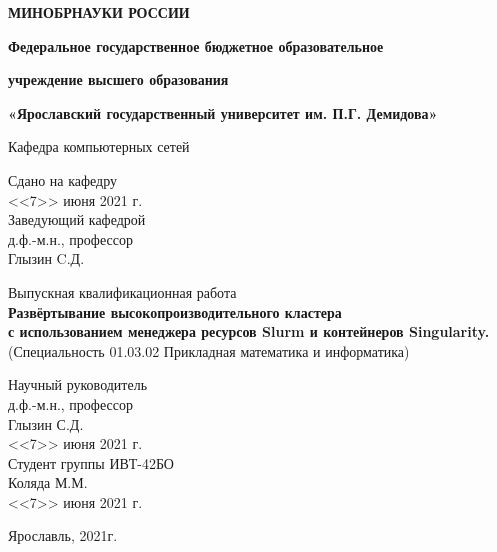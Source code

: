 \documentclass[a4paper]{extarticle}
\begin{document}
%
%
%
\begin{titlepage}
\fontsize{14pt}{12pt}
\begin{center}
\large
\textbf{МИНОБРНАУКИ РОССИИ}
\vspace{0.5cm}
			
\textbf{Федеральное государственное бюджетное образовательное}
		
\textbf{учреждение высшего образования}
		
\textbf{«Ярославский государственный университет им. П.Г. Демидова»}
\vspace{0.25cm}
			
			
Кафедра компьютерных сетей
\vfill

\begin{flushright}
Сдано на кафедру\\
<<7>> июня 2021 г.\\ 
Заведующий кафедрой\\
д.ф.-м.н., профессор\\
\underline{\hspace{2cm}}Глызин C.Д.\\
\end{flushright}
			
Выпускная квалификационная работа \\
\textbf{Развёртывание высокопроизводительного кластера} \\
\textbf{с использованием менеджера ресурсов Slurm и контейнеров Singularity.} \\
(Специальность 01.03.02 Прикладная математика и информатика) 
\vfill
\bigskip
\end{center}
\begin{flushright}
Научный руководитель\\
д.ф.-м.н., профессор\\
Глызин С.Д. \underline{\hspace{2cm}}\\
<<7>> июня 2021 г.\\
Студент группы ИВТ-42БО\\
Коляда М.М. \underline{\hspace{2cm}}\\
 <<7>> июня 2021 г.\\
\end{flushright}
\begin{center}
Ярославль, 2021г.
\end{center}
\end{titlepage}

\pagestyle{empty}
\tableofcontents
\clearpage
\pagestyle{plain}
\end{document}
